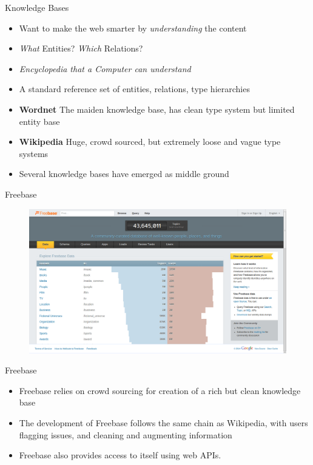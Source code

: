 
\begin{frame}{Knowledge Bases}
\begin{itemize}
\item Want to make the web smarter by \emph{understanding} the content \medskip
\item \emph{What} Entities? \emph{Which} Relations? \medskip
\item \emph{Encyclopedia that a Computer can understand} \medskip
 \item A standard reference set of entities, relations, type hierarchies \medskip
 \item \textbf{Wordnet}  The maiden knowledge base, has clean type system but limited entity base \medskip
 \item \textbf{Wikipedia} Huge, crowd sourced, but extremely loose and vague type systems \medskip
 \item Several knowledge bases have emerged as  middle ground 
\end{itemize}
\end{frame}

\begin{frame}{Freebase}
\begin{figure}[h]
 \centering
 \includegraphics[bb=0 0 1366 768,scale=0.25]{./freebase.png}
\end{figure}
 
\end{frame}
\begin{frame}{Freebase}
\begin{itemize}
 \item Freebase relies on crowd sourcing for creation of a rich but clean knowledge base \medskip
 \item The development of Freebase follows the same chain as 
Wikipedia, with users flagging issues, and cleaning and augmenting information \medskip
\item Freebase also provides access to itself using web APIs.
\end{itemize}
\end{frame}

